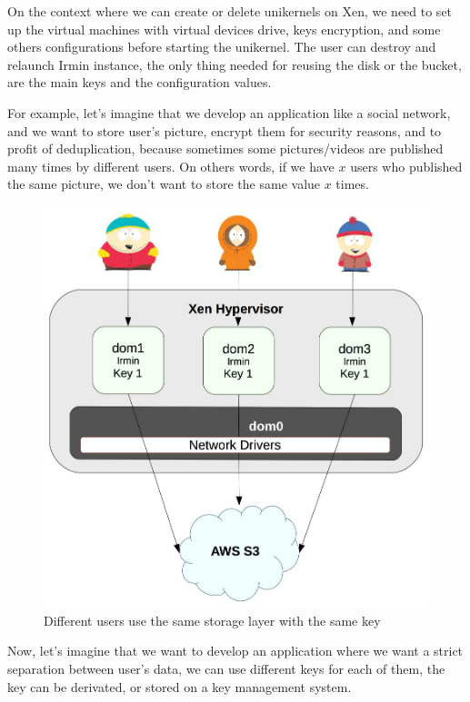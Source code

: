 \documentclass[10pt,a4paper]{report}
\begin{document}
On the context where we can create or delete unikernels on Xen, we need to set up the virtual machines with virtual devices drive, keys encryption, and some others configurations before starting the unikernel. The user can destroy and relaunch Irmin instance, the only thing needed for reusing the disk or the bucket, are the main keys and the configuration values. \newline\newline\newpage

For example, let's imagine that we develop an application like a social network, and we want to store user's picture, encrypt them for security reasons, and to profit of deduplication, because sometimes some  pictures/videos are published many times by different users.
On others words, if we have $x$ users who published the same picture, we don't want to store the same value $x$ times. \newline

\begin{figure}[H]
\centerline{\includegraphics[scale=0.4]{img/Irmin-MirageOS-different-user-same-disk.jpg}}
\caption{Different users use the same storage layer with the same key}
\end{figure}

\newpage
Now, let's imagine that we want to develop an application where we want a strict separation between user's data, we can use different keys for each of them, the key can be derivated, or stored on a key management system.  \newline
\end{document}
